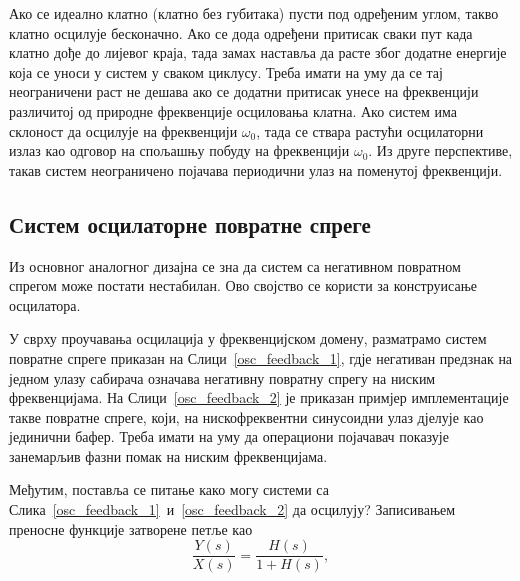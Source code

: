 \documentclass[master]{finthesis}
\begin{document}
Ако се идеално клатно (клатно без губитака) пусти под одређеним углом, такво клатно осцилује бесконачно. Ако се дода одређени притисак сваки пут када клатно дође до лијевог краја, тада замах наставља да расте због додатне енергије која се уноси у систем у сваком циклусу. Треба имати на уму да се тај неограничени раст не дешава ако се додатни притисак унесе на фреквенцији различитој од природне фреквенције осциловања клатна. Ако систем има склоност да осцилује на фреквенцији $\omega_{0}$, тада се ствара растући осцилаторни излаз као одговор на спољашњу побуду на фреквенцији $\omega_{0}$. Из друге перспективе, такав систем неограничено појачава периодични улаз на поменутој фреквенцији.

\subsection{Систем осцилаторне повратне спреге}
Из основног аналогног дизајна се зна да систем са негативном повратном спрегом може постати нестабилан. Ово својство се користи за конструисање осцилатора. \par
У сврху проучавања осцилација у фреквенцијском домену, разматрамо систем повратне спреге приказан на Слици~\ref{osc_feedback_1}, гдје негативан предзнак на једном улазу сабирача означава негативну повратну спрегу на ниским фреквенцијама. На Слици~\ref{osc_feedback_2} је приказан примјер имплементације такве повратне спреге, који, на нискофреквентни синусоидни улаз дјелује као јединични бафер. Треба имати на уму да операциони појачавач показује занемарљив фазни помак на ниским фреквенцијама. \par


Међутим, поставља се питање како могу системи са Слика~\ref{osc_feedback_1}~и~\ref{osc_feedback_2} да осцилују? Записивањем преносне функције затворене петље као 
\begin{equation} 
	\label{transfer_function}
	\frac{Y(s)}{X(s)}=\frac{H(s)}{1+H(s)},
\end{equation}
\end{document}
